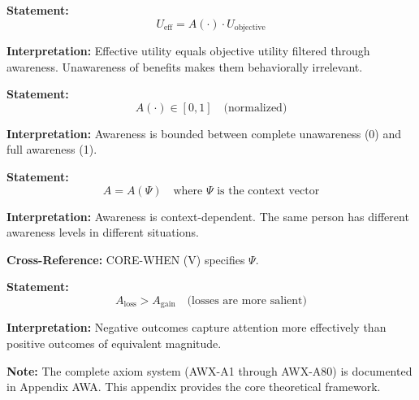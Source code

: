 \begin{tcolorbox}[colback=gray!5!white, colframe=gray!75!black,
    title=Axiom AWX-A1: Core Transformation]
\textbf{Statement:}
\begin{equation}
U_{\text{eff}} = A(\cdot) \cdot U_{\text{objective}}
\end{equation}

\textbf{Interpretation:} Effective utility equals objective utility filtered through awareness.
Unawareness of benefits makes them behaviorally irrelevant.
\end{tcolorbox}

\begin{tcolorbox}[colback=gray!5!white, colframe=gray!75!black,
    title=Axiom AWX-A2: Boundedness]
\textbf{Statement:}
\begin{equation}
A(\cdot) \in [0, 1] \quad \text{(normalized)}
\end{equation}

\textbf{Interpretation:} Awareness is bounded between complete unawareness (0) and
full awareness (1).
\end{tcolorbox}

\begin{tcolorbox}[colback=gray!5!white, colframe=gray!75!black,
    title=Axiom AWX-A3: Context Dependence]
\textbf{Statement:}
\begin{equation}
A = A(\Psi) \quad \text{where } \Psi \text{ is the context vector}
\end{equation}

\textbf{Interpretation:} Awareness is context-dependent. The same person has
different awareness levels in different situations.

\textbf{Cross-Reference:} CORE-WHEN (V) specifies $\Psi$.
\end{tcolorbox}

\begin{tcolorbox}[colback=gray!5!white, colframe=gray!75!black,
    title=Axiom AWX-A4: Asymmetry (Gains vs. Losses)]
\textbf{Statement:}
\begin{equation}
A_{\text{loss}} > A_{\text{gain}} \quad \text{(losses are more salient)}
\end{equation}

\textbf{Interpretation:} Negative outcomes capture attention more effectively
than positive outcomes of equivalent magnitude.
\end{tcolorbox}

\textbf{Note:} The complete axiom system (AWX-A1 through AWX-A80) is documented
in Appendix AWA. This appendix provides the core theoretical framework.


